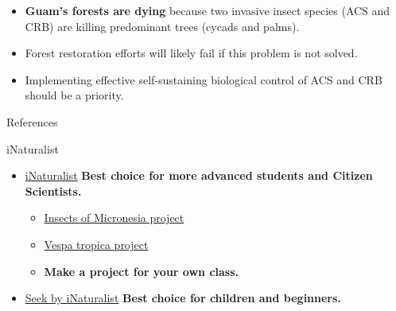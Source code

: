 \documentclass[]{beamer}
\begin{document}
\begin{frame}
	\begin{itemize}
		\item \textbf{Guam's forests are dying} because two invasive insect species (ACS and CRB) are killing predominant trees (cycads and palms).
		\item Forest restoration efforts will likely fail if this problem is not solved.
		\item Implementing effective self-sustaining biological control of ACS and CRB should be a priority.
	\end{itemize}
\end{frame}

\begin{frame}{}
\end{frame}

\begin{frame}{References}
	\nocite{*}
	\printbibliography
\end{frame}

\begin{frame}{iNaturalist}
	\begin{itemize}
		\item \href{https://www.inaturalist.org}{iNaturalist} \textbf{Best choice for more advanced students and Citizen Scientists.}
		\begin {itemize}
			\item \href{https://www.inaturalist.org/projects/insects-of-micronesia}{Insects of Micronesia project}
			\item \href{https://www.inaturalist.org/projects/vespa-tropica-on-guam}{Vespa tropica project}
			\item \textbf{Make a project for your own class.}
		\end{itemize}
		\item \href{https://www.inaturalist.org/pages/seek_app}{Seek by iNaturalist} \textbf{Best choice for children and beginners.}
	\end{itemize}	
\end{frame}	
	
\end{document}
